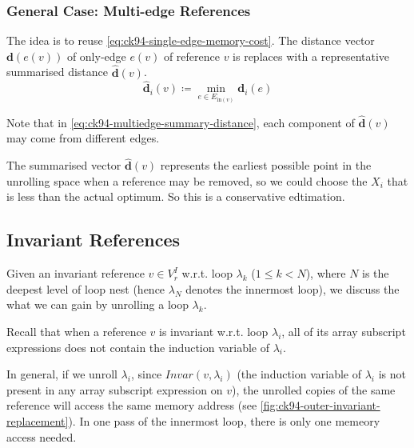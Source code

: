 \subsubsection{General Case: Multi-edge References}
The idea is to reuse \cref{eq:ck94-single-edge-memory-cost}. The distance vector
$\mathbf{d}(e(v))$ of only-edge $e(v)$ of reference $v$ is replaces with a
representative summarised distance $\hat{\mathbf{d}}(v)$.
\begin{equation}
  \hat{\mathbf{d}}_{i}(v) \coloneqq \min_{e \in E_{\text{in}(v)}} \mathbf{d}_{i}(e)
  \label{eq:ck94-multiedge-summary-distance}
\end{equation}

Note that in \cref{eq:ck94-multiedge-summary-distance}, each component of
$\hat{\mathbf{d}}(v)$ may come from different edges.

The summarised vector $\hat{\mathbf{d}}(v)$ represents the earliest possible
point in the unrolling space when a reference may be removed, so we could
choose the $X_{i}$ that is less than the actual optimum. So this is a
conservative edtimation.

\subsection{Invariant References}
Given an invariant reference $v \in V^{I}_{r}$ w.r.t. loop $\lambda_{k}$ ($1 \le
k < N$), where $N$ is the deepest level of loop nest (hence $\lambda_{N}$
denotes the innermost loop), we discuss the what we can gain by
unrolling a loop $\lambda_{k}$.

Recall that when a reference $v$ is invariant w.r.t. loop $\lambda_{i}$, all of
its array subscript expressions does not contain the induction variable of
$\lambda_{i}$.

In general, if we unroll $\lambda_{i}$, since $Invar(v, \lambda_{i})$
(the induction variable of $\lambda_i$ is not present in any array subscript
expression on $v$), the unrolled copies
of the same reference will access the same memory address (see
\cref{fig:ck94-outer-invariant-replacement}).
In one pass of the innermost loop, there is only one memeory access needed.

